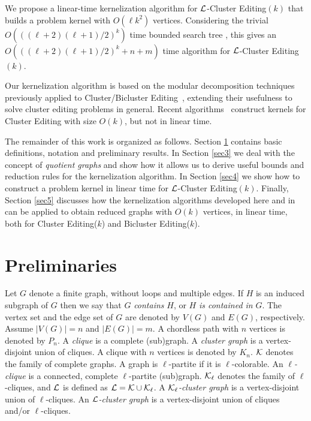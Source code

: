 \documentclass[12pt]{article}
\def\L{{\cal L}}
\def\KL{{\cal K}_{\ell}}
\begin{document}
We propose a linear-time kernelization algorithm for $\L${\sc -Cluster Editing}$(k)$
that builds a problem kernel with $O(\ell k^2)$ vertices.
Considering the trivial $O({((\ell+2)(\ell+1)/2)}^k)$ time
bounded search tree \cite{NR2000}, this gives an
$O({((\ell +2)(\ell +1)/2)}^k + n + m)$ time algorithm for $\L${\sc -Cluster Editing}$(k)$.

Our kernelization algorithm is based on the modular decomposition techniques
previously applied to {\sc Cluster/Bicluster
Editing}~\cite{DSPS2006,DSPS2009}, extending their usefulness to solve
cluster editing problems in general.
Recent algorithms~\cite{CM2011,G2007,YZ2007} construct kernels for {\sc Cluster Editing} with size $O(k)$, but not in linear time.


The remainder of this work is organized as follows. Section
\ref{sec2} contains basic definitions, notation and preliminary results.
In Section \ref{sec3} we deal with the concept of {\em quotient graphs} and show how it allows us to derive
useful bounds and reduction rules for the kernelization algorithm.
In Section \ref{sec4} we show how to construct a problem
kernel in linear time for $\L${\sc -Cluster Editing}$(k)$.
Finally, Section \ref{sec5} discusses how the kernelization algorithms developed here and in \cite{DSPS2006,DSPS2009}
can be applied to obtain reduced graphs with $O(k)$ vertices, in linear time, both for {\sc Cluster Editing($k$)} and {\sc Bicluster Editing($k$)}.


\section{Preliminaries} \label{sec2}

Let $G$ denote a finite graph, without loops and multiple edges.
If $H$ is an induced subgraph of $G$ then we say that $G$ {\it contains} $H$, or $H$ {\it is contained in} $G$.
The vertex set and the edge set of $G$ are denoted by $V(G)$ and $E(G)$, respectively.
Assume $|V(G)|=n$ and $|E(G)|=m$. A chordless path with $n$ vertices is denoted by $P_n$.
A \emph{clique} is a complete (sub)graph.  A \emph{cluster graph} is a vertex-disjoint union of cliques.
A clique with $n$ vertices is denoted by $K_n$. ${\cal K}$ denotes the family of complete graphs.
A graph is $\ell$-partite if it is $\ell$-colorable.
An \emph{$\ell$-clique} is a connected, complete $\ell$-partite (sub)graph.
$\KL$ denotes the family of $\ell$-cliques, and $\L$ is defined as $\L={\cal K} \cup \KL$.
A $\KL$\emph{-cluster graph} is a vertex-disjoint union of $\ell$-cliques.
An $\L$\emph{-cluster graph} is a vertex-disjoint union of cliques and/or $\ell$-cliques.
\end{document}
